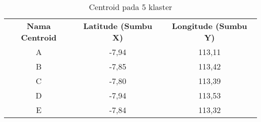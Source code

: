 \begin{table}[H]
\footnotesize
\centering
\begin{tabular}{ccc}
\rowcolor[HTML]{4472C4} 
{\color[HTML]{FFFFFF} \textbf{Nama   Centroid}} & {\color[HTML]{FFFFFF} \textbf{Latitude (Sumbu X)}} & {\color[HTML]{FFFFFF} \textbf{Longitude (Sumbu Y)}} \\
\rowcolor[HTML]{D9E1F2} 
A & -7,94 & 113,11 \\
B & -7,85 & 113,42 \\
\rowcolor[HTML]{D9E1F2} 
C & -7,80 & 113,39 \\
D & -7,94 & 113,53 \\
\rowcolor[HTML]{D9E1F2} 
E & -7,84 & 113,32
\end{tabular}
\caption{Centroid pada 5 klaster}
\label{tab:center5}
\end{table}